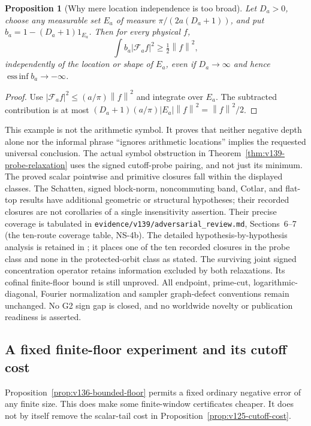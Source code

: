 \documentclass[11pt]{article}
\newtheorem{proposition}[theorem]{Proposition}
\theoremstyle{remark}
\newcommand{\norm}[1]{\left\lVert #1\right\rVert}
\begin{document}
\begin{proposition}[Why mere location independence is too broad]
\label{prop:v139-location-counterexample}
Let $D_a>0$, choose any measurable set $E_a$ of measure
$\pi/(2a(D_a+1))$, and put
$b_a=1-(D_a+1)1_{E_a}$. Then for every physical $f$,
\[
 \int b_a|\mathcal F_af|^2\ge\tfrac12\norm f^2,
\]
independently of the location or shape of $E_a$, even if
$D_a\to\infty$ and hence $\operatorname*{ess\,inf}b_a\to-\infty$.
\end{proposition}
\begin{proof}
Use $|\mathcal F_af|^2\le(a/\pi)\norm f^2$ and integrate over
$E_a$. The subtracted contribution is at most
$(D_a+1)(a/\pi)|E_a|\norm f^2=\norm f^2/2$.
\end{proof}

This example is not the arithmetic symbol. It proves that neither
negative depth alone nor the informal phrase ``ignores arithmetic
locations'' implies the requested universal conclusion. The actual
symbol obstruction in Theorem~\ref{thm:v139-probe-relaxation} uses
the signed cutoff-probe pairing, and not just its minimum.
The proved scalar pointwise and primitive closures fall within the
displayed classes. The Schatten, signed block-norm, noncommuting
band, Cotlar, and flat-top results have additional geometric or
structural hypotheses; their recorded closures are not corollaries
of a single insensitivity assertion. Their precise coverage is
tabulated in \texttt{evidence/v139/adversarial\_review.md},
Sections~6--7 (the ten-route coverage table, NS-4b). The detailed
hypothesis-by-hypothesis analysis is retained in
; it places one of the
ten recorded closures in the probe class and none in the protected-orbit
class as stated. The surviving joint signed
concentration operator retains information excluded by both
relaxations. Its cofinal finite-floor bound is still unproved.
All endpoint, prime-cut, logarithmic-diagonal, Fourier normalization
and sampler graph-defect conventions remain unchanged. No G2 sign
gap is closed, and no worldwide novelty or publication readiness is
asserted.


\subsection*{A fixed finite-floor experiment and its cutoff cost}

Proposition~\ref{prop:v136-bounded-floor} permits a fixed ordinary
negative error of any finite size. This does make some finite-window
certificates cheaper. It does not by itself remove the scalar-tail
cost in Proposition~\ref{prop:v125-cutoff-cost}.
\end{document}
